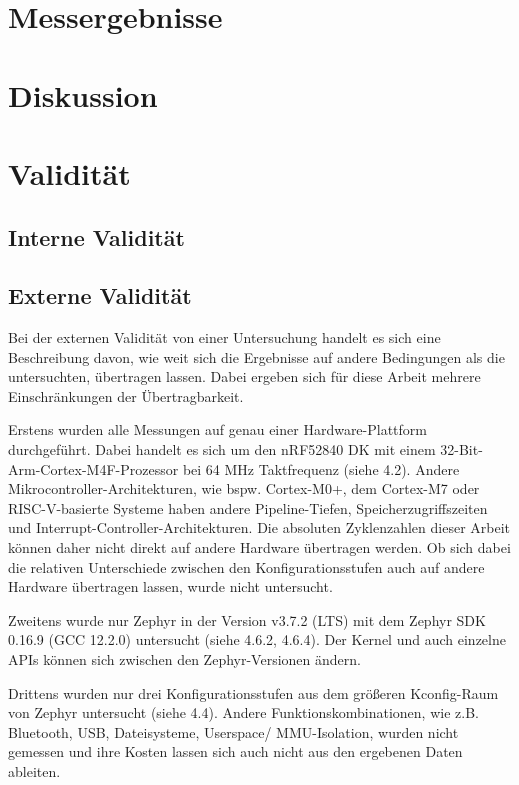 \chapter{Messergebnisse}
\label{ch:messergebnisse}

\chapter{Diskussion}
\label{ch:diskussion}

\chapter{Validität}

\section{Interne Validität  }

\section{Externe Validität  }
Bei der externen Validität von einer Untersuchung handelt es sich eine Beschreibung davon, wie weit sich die Ergebnisse auf andere Bedingungen als die untersuchten, übertragen lassen. Dabei ergeben sich für diese Arbeit mehrere Einschränkungen der Übertragbarkeit.

Erstens wurden alle Messungen auf genau einer Hardware-Plattform durchgeführt. Dabei handelt es sich um den nRF52840 DK mit einem 32-Bit-Arm-Cortex-M4F-Prozessor bei 64 MHz Taktfrequenz (siehe 4.2). Andere Mikrocontroller-Architekturen, wie bspw. Cortex-M0+, dem Cortex-M7 oder RISC-V-basierte Systeme haben andere Pipeline-Tiefen, Speicherzugriffszeiten und Interrupt-Controller-Architekturen. Die absoluten Zyklenzahlen dieser Arbeit können daher nicht direkt auf andere Hardware übertragen werden. Ob sich dabei die relativen Unterschiede zwischen den Konfigurationsstufen auch auf andere Hardware übertragen lassen, wurde nicht untersucht.

Zweitens wurde nur Zephyr in der Version v3.7.2 (LTS) mit dem Zephyr SDK 0.16.9 (GCC 12.2.0) untersucht (siehe 4.6.2, 4.6.4). Der Kernel und auch einzelne APIs können sich zwischen den Zephyr-Versionen ändern.

Drittens wurden nur drei Konfigurationsstufen aus dem größeren Kconfig-Raum von Zephyr untersucht (siehe 4.4). Andere Funktionskombinationen, wie z.B. Bluetooth, USB, Dateisysteme, Userspace/ MMU-Isolation, wurden nicht gemessen und ihre Kosten lassen sich auch nicht aus den ergebenen Daten ableiten.

